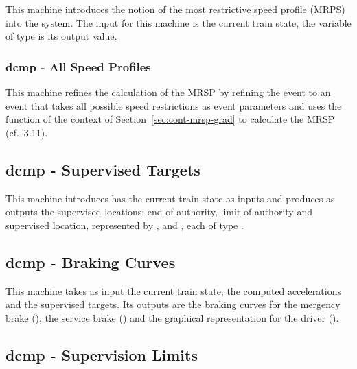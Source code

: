 \documentclass{template/openetcs_article}
\begin{document}
This machine introduces the notion of the most restrictive speed profile (MRPS)
into the system. The input for this machine is the current train state, the
variable  of type  is its output value.

{\footnotesize

}

\subsubsection{dcmp - All Speed Profiles}
\label{sec:dcmp-all-speed}

This machine refines the calculation of the MRSP by refining the event
 to an event that takes all possible speed restrictions as
event parameters and uses the function of the context of
Section~\ref{sec:cont-mrsp-grad} to calculate the MRSP (cf.~3.11).

{\footnotesize

}

\subsection{dcmp - Supervised Targets}
\label{sec:dcmp-superv-targ}

This machine introduces has the current train state as inputs and produces as
outputs the supervised locations: end of authority, limit of authority and
supervised location, represented by ,  and , each
of type .

{\footnotesize

}

\subsection{dcmp - Braking Curves}
\label{sec:dcmp-braking-curves}

This machine takes as input the current train state, the computed accelerations
and the supervised targets. Its outputs are the braking curves for the mergency
brake (), the service brake () and the graphical
representation for the driver ().

{\footnotesize

}

\subsection{dcmp - Supervision Limits}
\label{sec:dcmp-superv-limits}
\end{document}
